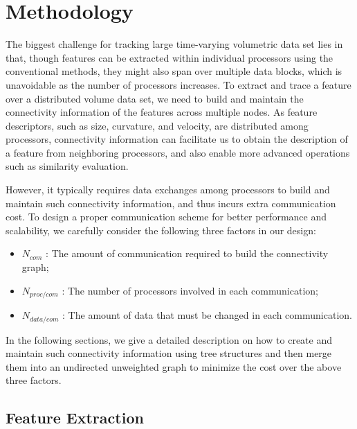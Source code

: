 \section{Methodology}
The biggest challenge for tracking large time-varying volumetric data set lies in that, though features can be extracted within individual processors using the conventional methods, they might also span over multiple data blocks, which is unavoidable as the number of processors increases. To extract and trace a feature over a distributed volume data set, we need to build and maintain the connectivity information of the features across multiple nodes. As feature descriptors, such as size, curvature, and velocity, are distributed among processors, connectivity information can facilitate us to obtain the description of a feature from neighboring processors, and also enable more advanced operations such as similarity evaluation.

However, it typically requires data exchanges among processors to build and maintain such connectivity information, and thus incurs extra communication cost. To design a proper communication scheme for better performance and scalability, we carefully consider the following three factors in our design:

\begin{itemize}
	\item $N_{com}$ : The amount of communication required to build the connectivity graph;
	\item $N_{proc/com}$ : The number of processors involved in each communication;
	\item $N_{data/com}$ : The amount of data that must be changed in each communication.
\end{itemize}

In the following sections, we give a detailed description on how to create and maintain such connectivity information using tree structures and then merge them into an undirected unweighted graph to minimize the cost over the above three factors.

\subsection{Feature Extraction}

